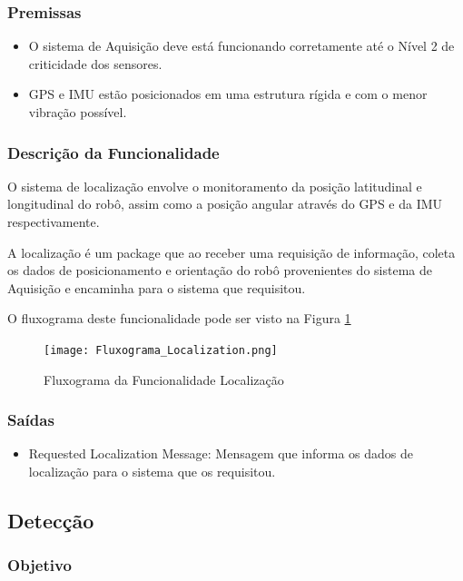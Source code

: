 \subsubsection{Premissas}
\begin{itemize}
	\item O sistema de Aquisição deve está funcionando corretamente até o Nível 2 de criticidade dos sensores.
	\item GPS e IMU estão posicionados em uma estrutura rígida e com o menor vibração possível.
\end{itemize}

\subsubsection{Descrição da Funcionalidade}
O sistema de localização envolve o monitoramento da posição latitudinal e longitudinal do robô, assim como a posição angular através do GPS e da IMU respectivamente.

A localização é um package que ao receber uma requisição de informação, coleta os dados de posicionamento e orientação do robô provenientes do sistema de Aquisição e encaminha para o sistema que requisitou.

O fluxograma deste funcionalidade pode ser visto na Figura \ref{fluxlocal}

\begin{figure}[h!]
	\centering
	\texttt{[image: Fluxograma\_Localization.png]}
	\caption{Fluxograma da Funcionalidade Localização} \label{fluxlocal}
\end{figure}
\pagebreak
\subsubsection{Saídas}

\begin{itemize}
	\item Requested Localization Message: Mensagem que informa os dados de localização para o sistema que os requisitou.
\end{itemize}

\subsection{Detecção}
\label{ssec:func3}

\subsubsection{Objetivo}

